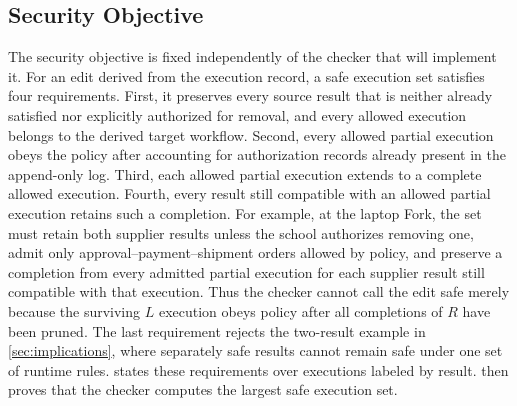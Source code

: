 \subsection{Security Objective}

The security objective is fixed independently of the checker that will implement it.
For an edit derived from the execution record, a safe execution set satisfies four requirements.
First, it preserves every source result that is neither already satisfied nor explicitly authorized for removal, and every allowed execution belongs to the derived target workflow.
Second, every allowed partial execution obeys the policy after accounting for authorization records already present in the append-only log.
Third, each allowed partial execution extends to a complete allowed execution.
Fourth, every result still compatible with an allowed partial execution retains such a completion.
For example, at the laptop Fork, the set must retain both supplier results unless the school authorizes removing one, admit only approval--payment--shipment orders allowed by policy, and preserve a completion from every admitted partial execution for each supplier result still compatible with that execution.
Thus the checker cannot call the edit safe merely because the surviving \(L\) execution obeys policy after all completions of \(R\) have been pruned.
The last requirement rejects the two-result example in \cref{sec:implications}, where separately safe results cannot remain safe under one set of runtime rules.
 states these requirements over executions labeled by result.
 then proves that the checker computes the largest safe execution set.

